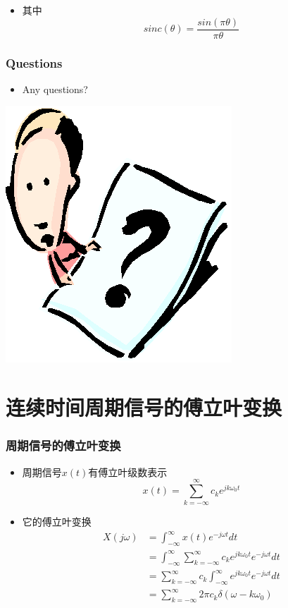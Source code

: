 \documentclass[CJKutf8,xcolor=pdftex,dvipsnames,table]{beamer}
\begin{document}
\begin{CJK*}{UTF8}{song}
\begin{frame}
\begin{itemize}
		\begin{itemize}
		\item 其中
    	\[
    		sinc(\theta) = \frac{sin(\pi\theta)}{\pi\theta}
    	\]	
		\end{itemize}	
    \end{itemize}

  \end{frame} 
     
  \begin{frame}
    \frametitle{Questions}
    \begin{itemize}
    \item Any questions?
    \end{itemize}
    \begin{center}
      \includegraphics[scale=.5]{question}
    \end{center}
  \end{frame} 
  
  \section{连续时间周期信号的傅立叶变换}
  
  \begin{frame}
    \frametitle{周期信号的傅立叶变换}
    \begin{itemize}
    \item 周期信号$x(t)$有傅立叶级数表示
    \[ 
    	x(t)=\sum_{k=-\infty}^{\infty}c_k e^{jk\omega_0 t} 
    \]
    \item 它的傅立叶变换
    	\begin{align*}
 		X(j\omega) & = \int_{-\infty}^{\infty}x(t)e^{-j\omega t}dt    \\
		& = \int_{-\infty}^{\infty}\sum_{k=-\infty}^{\infty}c_k e^{jk\omega_0 t}e^{-j\omega t}dt    \\
		& = \sum_{k=-\infty}^{\infty}c_k \int_{-\infty}^{\infty}e^{jk\omega_0 t}e^{-j\omega t}dt  \\
		& = \sum_{k=-\infty}^{\infty}2\pi c_k \delta(\omega-k\omega_0)
    	\end{align*}    
    \end{itemize}
  \end{frame}
  

\end{CJK*}
\end{document}

